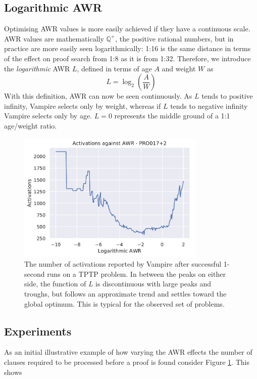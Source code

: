 \documentclass{llncs}
\begin{document}
\subsection{Logarithmic AWR}
Optimising AWR values is more easily achieved if they have a continuous scale.
AWR values are mathematically \(\mathbb{Q}^{+}\), the positive rational numbers, but in practice are more easily seen logarithmically: 1:16 is the same distance in terms of the effect on proof search from 1:8 as it is from 1:32.
Therefore, we introduce the \emph{logarithmic} AWR \(L\), defined in terms of age \(A\) and weight \(W\) as
\[
	L = \log_2{\left(\frac{A}{W}\right)}
\]
With this definition, AWR can now be seen continuously.
As \(L\) tends to positive infinity, Vampire selects only by weight, whereas if \(L\) tends to negative infinity Vampire selects only by age.
\(L = 0\) represents the middle ground of a 1:1 age/weight ratio.

\begin{figure}[t]
	\centering
	\includegraphics[width=0.8\textwidth]{example-optimal-awr}
	\caption{
The number of activations reported by Vampire after successful 1-second runs on a TPTP problem.
In between the peaks on either side, the function of \(L\) is discontinuous with large peaks and troughs, but follows an approximate trend and settles toward the global optimum.
This is typical for the observed set of problems.
}
	\label{fig:example-optimal-awr}
\end{figure}

\subsection{Experiments}
As an initial illustrative example of how varying the AWR effects the number of clauses required to be processed before a proof is found consider Figure \ref{fig:example-optimal-awr}. This shows 
\end{document}
